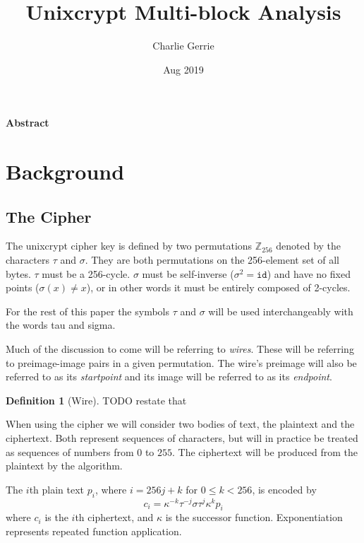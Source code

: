 \documentclass[12pt]{article}
\title{Unixcrypt Multi-block Analysis}
\date{Aug 2019}
\author{Charlie Gerrie}
\theoremstyle{definition}
\newtheorem{definition}{Definition}%
\theoremstyle{remark}
\theoremstyle{remark}
\begin{document}
\maketitle
\newpage

\begin{center}{\textbf{Abstract}}\end{center}
\newpage

\section{Background}

\subsection{The Cipher}
\par
The unixcrypt cipher key is defined by two permutations $\mathbb{Z}_{256}$ denoted by the characters $\tau$ and $\sigma$. They are both permutations on the 256-element set of all bytes. $\tau$ must be a 256-cycle. $\sigma$ must be self-inverse ($\sigma^2=\texttt{id}$) and have no fixed points ($\sigma(x)\neq x$), or in other words it must be entirely composed of 2-cycles.

\par
For the rest of this paper the symbols $\tau$ and $\sigma$ will be used interchangeably with the words tau and sigma.

\par
Much of the discussion to come will be referring to \emph{wires}. These will be referring to preimage-image pairs in a given permutation. The wire's preimage will also be referred to as its \emph{startpoint} and its image will be referred to as its \emph{endpoint}. 
\begin{definition}[Wire]
	TODO restate that
\end{definition}

\par
When using the cipher we will consider two bodies of text, the plaintext and the ciphertext. Both represent sequences of characters, but will in practice be treated as sequences of numbers from $0$ to $255$. The ciphertext will be produced from the plaintext by the algorithm.

\par The $i$th plain text $p_i$, where $i=256 j + k$ for $0\leq k < 256$, is encoded by
\begin{equation}
	\label{ciphereq}
	c_i = \kappa^{-k} \tau^{-j} \sigma \tau^j \kappa^k p_i
\end{equation}
where $c_i$ is the $i$th ciphertext, and $\kappa$ is the successor function. Exponentiation represents repeated function application.
\end{document}

